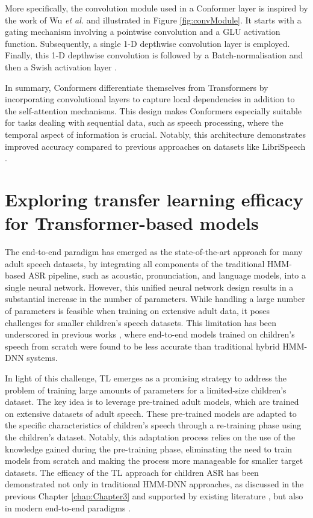 More specifically, the convolution module used in a Conformer layer is inspired by the work of Wu \textit{et al.} \cite{wu2020lite} and illustrated in Figure \ref{fig:convModule}. It starts with a gating mechanism \cite{dauphin2017language} involving a pointwise convolution and a \ac{GLU} activation function. Subsequently, a single 1-D depthwise convolution layer is employed. Finally, this 1-D depthwise convolution is followed by a Batch-normalisation and then a Swish activation layer \cite{Prajit2017Searching}.

In summary, Conformers differentiate themselves from Transformers by incorporating convolutional layers to capture local dependencies in addition to the self-attention mechanisms. This design makes Conformers especially suitable for tasks dealing with sequential data, such as speech processing, where the temporal aspect of information is crucial. Notably, this architecture demonstrates improved accuracy compared to previous approaches on datasets like LibriSpeech \cite{gulati2020conformer}.


\section{Exploring transfer learning efficacy for Transformer-based models}
The end-to-end paradigm has emerged as the state-of-the-art approach for many adult speech datasets, by integrating all components of the traditional \ac{HMM}-based \ac{ASR} pipeline, such as acoustic, pronunciation, and language models, into a single neural network. However, this unified neural network design results in a substantial increase in the number of parameters. While handling a large number of parameters is feasible when training on extensive adult data, it poses challenges for smaller children's speech datasets. This limitation has been underscored in previous works \cite{sri_end2end,gelin2021endtoend}, where end-to-end models trained on children's speech from scratch were found to be less accurate than traditional hybrid \ac{HMM-DNN} systems.

In light of this challenge, \ac{TL} emerges as a promising strategy to address the problem of training large amounts of parameters for a limited-size children's dataset. The key idea is to leverage pre-trained adult models, which are trained on extensive datasets of adult speech. These pre-trained models are adapted to the specific characteristics of children's speech through a re-training phase using the children's dataset. Notably, this adaptation process relies on the use of the knowledge gained during the pre-training phase, eliminating the need to train models from scratch and making the process more manageable for smaller target datasets. The efficacy of the \ac{TL} approach for children \ac{ASR} has been demonstrated not only in traditional \ac{HMM-DNN} approaches, as discussed in the previous Chapter \ref{chap:Chapter3} and supported by existing literature \cite{shivakumar2020transfer}, but also in modern end-to-end paradigms \cite{sri_end2end,gelin2021endtoend}.

